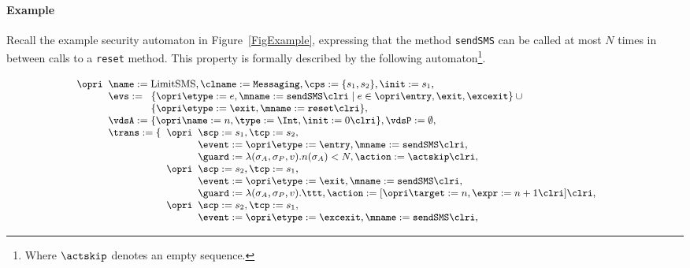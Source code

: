 \paragraph{Example}
Recall the example security automaton in Figure~\ref{FigExample},
expressing that the method \texttt{sendSMS} can
be called at most \(N\) times in between calls to a \texttt{reset}
method. This property is formally described by the following
automaton\footnote{Where \(\actskip\) denotes an empty sequence.}.

\[
\small{
\begin{array}[t]{l}
\opri
\begin{array}[t]{l}
\name := \textrm{LimitSMS}, \clname := \texttt{Messaging},
\cps := \{s_1, s_2\},
\init := s_1,\\
\evs :=
\begin{array}[t]{l}
\{ \opri \etype := e, \mname := \texttt{sendSMS} \clri \mid e \in \opri \entry,
\exit, \excexit \} \:\cup \\
\{ \opri \etype := \exit, \mname := \texttt{reset} \clri\},
\end{array}
\\
\vdsA := \{\opri \name := n, \type := \Int, \init := 0 \clri\},
\vdsP := \emptyset,\\
\trans := \{
\begin{array}[t]{l}
\opri
 \begin{array}[t]{l}
\scp := s_1, \tcp := s_2, \\
             \event := \opri \etype := \entry,
                             \mname := \texttt{sendSMS} \clri, \\
             \guard := \lambda(\sigma_A, \sigma_P, v). n(\sigma_A) < N,
             \action := \actskip
            \clri,
\end{array}\\
\opri
 \begin{array}[t]{l}
\scp := s_2, \tcp := s_1, \\
             \event := \opri \etype := \exit,
                             \mname := \texttt{sendSMS} \clri, \\
             \guard := \lambda(\sigma_A, \sigma_P, v). \ttt,
             \action := [\opri \target := n, \expr := n + 1 \clri]
            \clri,
\end{array}\\
\opri
 \begin{array}[t]{l}
\scp := s_2, \tcp := s_1, \\
             \event := \opri \etype := \excexit,
                             \mname := \texttt{sendSMS} \clri, \\

\end{array}
\end{array}
\end{array}
\end{array}}\]
